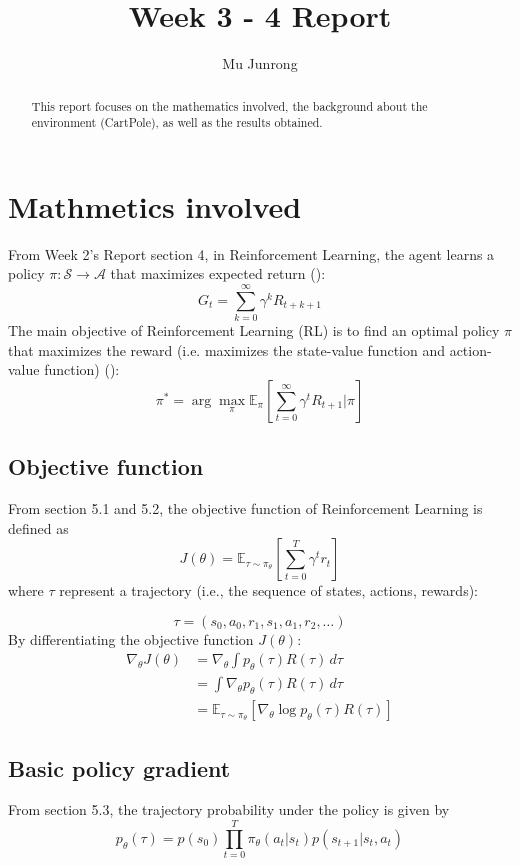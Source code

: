 \documentclass{article} %
\title{Week 3 - 4 Report}
\author{Mu Junrong}
\begin{document}
\ifcolmsubmission
\linenumbers
\fi

\maketitle

\begin{abstract}
This report focuses on the mathematics involved, 
the background about the environment (CartPole), as well as the results obtained.
\end{abstract}

\section{Mathmetics involved}
From Week 2's Report section 4, in Reinforcement Learning, the agent learns a policy \(\pi : \mathcal{S} \to \mathcal{A}\) 
that maximizes expected return (\cite{sutton2018reinforcement}):
\[G_t = \sum_{k=0}^\infty \gamma^k R_{t+k+1}\]
The main objective of Reinforcement Learning (RL) is to find an optimal policy $\pi$ that maximizes the reward (i.e. maximizes the state-value function and action-value function) (\cite{sutton1999policy}):
\[
\pi^{*} = \arg \max_{\pi} \mathbb{E}_{\pi} \left[ \sum_{t=0}^{\infty} \gamma^t R_{t+1} | \pi \right]
\]

\subsection{Objective function}
From section 5.1 and 5.2, the objective function of Reinforcement Learning is defined as
\[
J(\theta) = \mathbb{E}_{\tau \sim \pi_{\theta}} \left[ \sum_{t=0}^{T} \gamma^{t} r_{t} \right]
\]
where \(\tau\) represent a trajectory (i.e., the sequence of states, actions, rewards):

\[
\tau = (s_0, a_0, r_1, s_1, a_1, r_2, \ldots)
\]
By differentiating the objective function \(J(\theta)\):
\begin{align*}
\nabla_\theta J(\theta) &= \nabla_\theta \int p_\theta(\tau) R(\tau) \,d\tau \\
&= \int \nabla_\theta p_\theta(\tau) R(\tau) \,d\tau \\
&= \mathbb{E}_{\tau \sim \pi_\theta} \left[ \nabla_\theta \log p_\theta(\tau) R(\tau) \right]
\end{align*}

\subsection{Basic policy gradient}
From section 5.3, the trajectory probability under the policy is given by
\[p_\theta(\tau) = p(s_0) \prod_{t=0}^{T} \pi_\theta(a_t|s_t) p(s_{t+1}|s_t, a_t)\]
\end{document}
